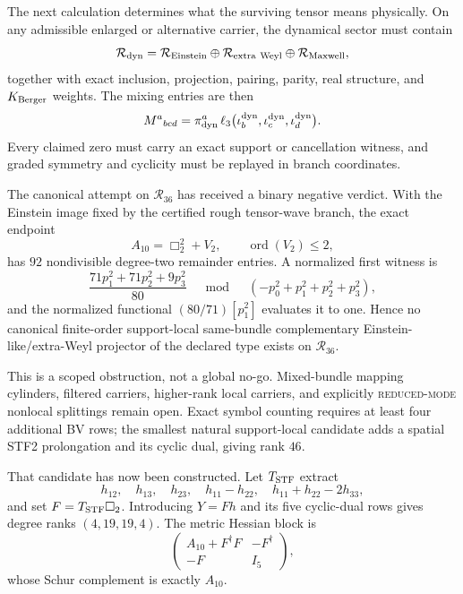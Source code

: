 \documentclass[11pt]{article}
\theoremstyle{definition}
\theoremstyle{remark}
\newcommand{\cR}{\mathcal R}
\begin{document}
The next calculation determines what the surviving tensor means physically.
On any admissible enlarged or alternative carrier, the dynamical sector must
contain
\begin{equation}
 \cR_{\rm dyn}
 =\cR_{\rm Einstein}\oplus\cR_{\rm extra\ Weyl}
  \oplus\cR_{\rm Maxwell},
\end{equation}
together with exact inclusion, projection, pairing, parity, real structure,
and $K_{\rm Berger}$ weights.  The mixing entries are then
\begin{equation}\label{eq:mixing}
 M^{a}{}_{bcd}
 =\pi^{a}_{\rm dyn}\,
   \ell_3\bigl(\iota^{\rm dyn}_{b},
               \iota^{\rm dyn}_{c},
               \iota^{\rm dyn}_{d}\bigr).
\end{equation}
Every claimed zero must carry an exact support or cancellation witness, and
graded symmetry and cyclicity must be replayed in branch coordinates.

The canonical attempt on $\cR_{36}$ has received a binary negative verdict.
With the Einstein image fixed by the certified rough tensor-wave branch, the
exact endpoint
\begin{equation}
 A_{10}=\Box_2^2+V_2,\qquad \operatorname{ord}(V_2)\leq2,
\end{equation}
has $92$ nondivisible degree-two remainder entries.  A normalized first
witness is
\begin{equation}\label{eq:projector-obstruction}
 \frac{71p_1^2+71p_2^2+9p_3^2}{80}
 \quad\bmod\quad
 (-p_0^2+p_1^2+p_2^2+p_3^2),
\end{equation}
and the normalized functional $(80/71)[p_1^2]$ evaluates it to one.  Hence no
canonical finite-order support-local same-bundle complementary
Einstein-like/extra-Weyl projector of the declared type exists on
$\cR_{36}$.

This is a scoped obstruction, not a global no-go.  Mixed-bundle mapping
cylinders, filtered carriers, higher-rank local carriers, and explicitly
\textsc{reduced-mode} nonlocal splittings remain open.  Exact symbol counting
requires at least four additional BV rows; the smallest natural support-local
candidate adds a spatial STF2 prolongation and its cyclic dual, giving rank
$46$.

That candidate has now been constructed.  Let $T_{\rm STF}$ extract
\begin{equation}
 h_{12},\quad h_{13},\quad h_{23},\quad h_{11}-h_{22},\quad
 h_{11}+h_{22}-2h_{33},
\end{equation}
and set $F=T_{\rm STF}\Box_2$.  Introducing $Y=Fh$ and its five cyclic-dual
rows gives degree ranks $(4,19,19,4)$.  The metric Hessian block is
\begin{equation}\label{eq:rank46-hessian}
 \begin{pmatrix}
 A_{10}+F^\dagger F&-F^\dagger\\
 -F&I_5
 \end{pmatrix},
\end{equation}
whose Schur complement is exactly $A_{10}$.
\end{document}
